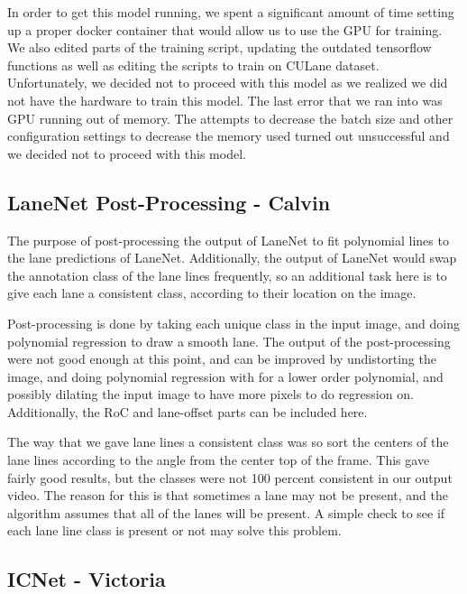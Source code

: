 \documentclass[twoside,twocolumn]{article}
\begin{document}
\par In order to get this model running, we spent a significant amount of time setting up a proper docker container that would allow us to use the GPU for training. We also edited parts of the training script, updating the outdated tensorflow functions as well as editing the scripts to train on CULane dataset. Unfortunately, we decided not to proceed with this model as we realized we did not have the hardware to train this model. The last error that we ran into was GPU running out of memory. The attempts to decrease the batch size and other configuration settings to decrease the memory used turned out unsuccessful and we decided not to proceed with this model.


\subsection{LaneNet Post-Processing - Calvin}
\par The purpose of post-processing the output of LaneNet to fit polynomial lines to the lane predictions of LaneNet. Additionally, the output of LaneNet would swap the annotation class of the lane lines frequently, so an additional task here is to give each lane a consistent class, according to their location on the image.
\par Post-processing is done by taking each unique class in the input image, and doing polynomial regression to draw a smooth lane. The output of the post-processing were not good enough at this point, and can be improved by undistorting the image, and doing polynomial regression with for a lower order polynomial, and possibly dilating the input image to have more pixels to do regression on. Additionally, the RoC and lane-offset parts can be included here.
\par The way that we gave lane lines a consistent class was so sort the centers of the lane lines according to the angle from the center top of the frame. This gave fairly good results, but the classes were not 100 percent consistent in our output video. The reason for this is that sometimes a lane may not be present, and the algorithm assumes that all of the lanes will be present. A simple check to see if each lane line class is present or not may solve this problem.



\subsection{ICNet - Victoria}
\end{document}
